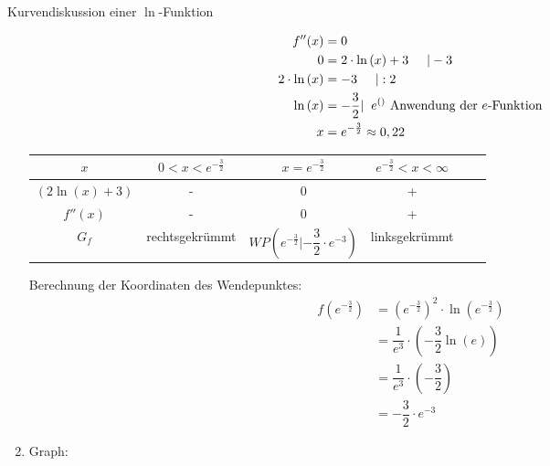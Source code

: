 \begin{bsp}{Kurvendiskussion einer $\ln$-Funktion}{ }
\begin{enumerate}
\begin{equation*}
            \begin{split}
                f''(x)&=0\\
               0&= 2\cdot \ln{(x)} + 3 \hspace{0.5cm} | - 3\\
               2\cdot \ln{(x)}&= -3 \hspace{0.5cm} | : 2\\
               \ln{(x)}&= -\dfrac{3}{2}  |\hspace{0.2cm} e^{()} \text{ Anwendung der $e$-Funktion}\\
               x&= e^{-\frac{3}{2} }\approx 0,22
            \end{split}
        \end{equation*}
        \begin{center}\begin{tabular}{||c|c|c|c|c|c||}
    \hline
    $x$& $ 0<x<e^{-\frac{3}{2}} $ & $ x =e^{-\frac{3}{2}}$ &$ e^{-\frac{3}{2}}<x<\infty $ \\
    \hline \hline
    $(2\ln{(x)}+3)$ & - & 0 & +  \\
     \hline
    $f''(x)$ & - & 0 & + \\ 
    \hline
    \hline
    $G_f$ & rechtsgekrümmt & $WP(e^{-\frac{3}{2}}|-\dfrac{3}{2} \cdot e^{-3})$ & linksgekrümmt \\
    \hline
\end{tabular}
\end{center}
Berechnung der Koordinaten des Wendepunktes:
\begin{equation*}
            \begin{split}
                f(e^{-\frac{3}{2}})&=\left(e^{-\frac{3}{2}}\right)^2 \cdot \ln{(e^{-\frac{3}{2}})}\\
            &= \dfrac{1}{e^3} \cdot \left(-\dfrac{3}{2} \ln{(e)}\right)\\
            &= \dfrac{1}{e^3} \cdot \left(-\dfrac{3}{2}\right)\\
               &= -\dfrac{3}{2} \cdot e^{-3}
            \end{split}
        \end{equation*}
\item Graph:
\begin{center}
\end{center}
\end{enumerate}
 \end{bsp}
